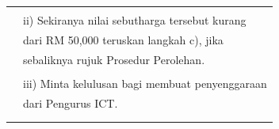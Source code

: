 \documentclass[
]{article}
\begin{document}
\begin{longtable}[]{@{}ll@{}}
\begin{minipage}[t]{0.71\columnwidth}
\strut
\end{minipage}\tabularnewline
\begin{minipage}[t]{0.23\columnwidth}\raggedright
\strut
\end{minipage} & \begin{minipage}[t]{0.71\columnwidth}\raggedright
ii) Sekiranya nilai sebutharga tersebut kurang\strut
\end{minipage}\tabularnewline
\begin{minipage}[t]{0.23\columnwidth}\raggedright
\strut
\end{minipage} & \begin{minipage}[t]{0.71\columnwidth}\raggedright
dari RM 50,000 teruskan langkah c), jika\strut
\end{minipage}\tabularnewline
\begin{minipage}[t]{0.23\columnwidth}\raggedright
\strut
\end{minipage} & \begin{minipage}[t]{0.71\columnwidth}\raggedright
sebaliknya rujuk Prosedur Perolehan.\strut
\end{minipage}\tabularnewline
\begin{minipage}[t]{0.23\columnwidth}\raggedright
\strut
\end{minipage} & \begin{minipage}[t]{0.71\columnwidth}\raggedright
\strut
\end{minipage}\tabularnewline
\begin{minipage}[t]{0.23\columnwidth}\raggedright
\strut
\end{minipage} & \begin{minipage}[t]{0.71\columnwidth}\raggedright
iii) Minta kelulusan bagi membuat penyenggaraan\strut
\end{minipage}\tabularnewline
\begin{minipage}[t]{0.23\columnwidth}\raggedright
\strut
\end{minipage} & \begin{minipage}[t]{0.71\columnwidth}\raggedright
dari Pengurus ICT.\strut
\end{minipage}\tabularnewline
\begin{minipage}[t]{0.23\columnwidth}\raggedright
\strut
\end{minipage} & \begin{minipage}[t]{0.71\columnwidth}\raggedright
\strut
\end{minipage}\tabularnewline
\begin{minipage}[t]{0.23\columnwidth}\raggedright

\end{minipage}
\end{longtable}
\end{document}
